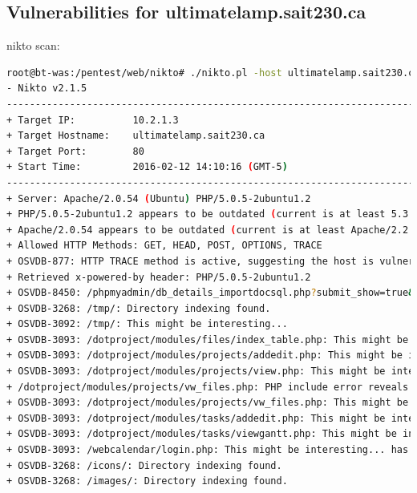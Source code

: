 \documentclass{article}
\begin{document}
\subsection{Vulnerabilities for ultimatelamp.sait230.ca}
nikto scan:

\begin{lstlisting}[language=Bash]
root@bt-was:/pentest/web/nikto# ./nikto.pl -host ultimatelamp.sait230.ca -p 80
- Nikto v2.1.5
---------------------------------------------------------------------------
+ Target IP:          10.2.1.3
+ Target Hostname:    ultimatelamp.sait230.ca
+ Target Port:        80
+ Start Time:         2016-02-12 14:10:16 (GMT-5)
---------------------------------------------------------------------------
+ Server: Apache/2.0.54 (Ubuntu) PHP/5.0.5-2ubuntu1.2
+ PHP/5.0.5-2ubuntu1.2 appears to be outdated (current is at least 5.3.6)
+ Apache/2.0.54 appears to be outdated (current is at least Apache/2.2.19). Apache 1.3.42 (final release) and 2.0.64 are also current.
+ Allowed HTTP Methods: GET, HEAD, POST, OPTIONS, TRACE 
+ OSVDB-877: HTTP TRACE method is active, suggesting the host is vulnerable to XST
+ Retrieved x-powered-by header: PHP/5.0.5-2ubuntu1.2
+ OSVDB-8450: /phpmyadmin/db_details_importdocsql.php?submit_show=true&do=import&docpath=../: phpMyAdmin allows directory listings remotely. Upgrade to version 2.5.3 or higher. http://www.securityfocus.com/bid/7963.
+ OSVDB-3268: /tmp/: Directory indexing found.
+ OSVDB-3092: /tmp/: This might be interesting...
+ OSVDB-3093: /dotproject/modules/files/index_table.php: This might be interesting... has been seen in web logs from an unknown scanner.
+ OSVDB-3093: /dotproject/modules/projects/addedit.php: This might be interesting... has been seen in web logs from an unknown scanner.
+ OSVDB-3093: /dotproject/modules/projects/view.php: This might be interesting... has been seen in web logs from an unknown scanner.
+ /dotproject/modules/projects/vw_files.php: PHP include error reveals the full path to the web root.
+ OSVDB-3093: /dotproject/modules/projects/vw_files.php: This might be interesting... has been seen in web logs from an unknown scanner.
+ OSVDB-3093: /dotproject/modules/tasks/addedit.php: This might be interesting... has been seen in web logs from an unknown scanner.
+ OSVDB-3093: /dotproject/modules/tasks/viewgantt.php: This might be interesting... has been seen in web logs from an unknown scanner.
+ OSVDB-3093: /webcalendar/login.php: This might be interesting... has been seen in web logs from an unknown scanner.
+ OSVDB-3268: /icons/: Directory indexing found.
+ OSVDB-3268: /images/: Directory indexing found.

\end{lstlisting}
\end{document}
